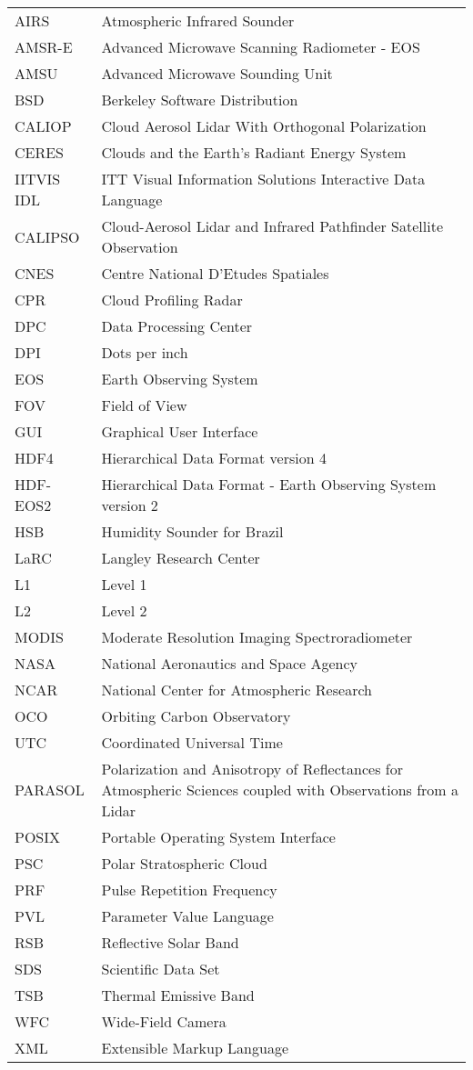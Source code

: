 \hspace{-7pt}%
\begin{tabularx}{\textwidth}{lX}
AIRS 		&Atmospheric Infrared Sounder\\
AMSR-E		&Advanced Microwave Scanning Radiometer - EOS\\
AMSU		&Advanced Microwave Sounding Unit\\
BSD		&Berkeley Software Distribution\\
CALIOP		&Cloud Aerosol Lidar With Orthogonal Polarization\\
CERES		&Clouds and the Earth’s Radiant Energy System\\
IITVIS IDL	&ITT Visual Information Solutions Interactive Data Language\\
CALIPSO		&Cloud-Aerosol Lidar and Infrared Pathfinder Satellite Observation\\
CNES		&Centre National D'Etudes Spatiales\\
CPR		&Cloud Profiling Radar\\
DPC		&Data Processing Center\\
DPI		&Dots per inch\\
EOS		&Earth Observing System\\
FOV		&Field of View\\
GUI		&Graphical User Interface\\
HDF4		&Hierarchical Data Format version 4\\
HDF-EOS2	&Hierarchical Data Format - Earth Observing System version 2\\
HSB		&Humidity Sounder for Brazil\\
LaRC		&Langley Research Center\\
L1		&Level 1\\
L2		&Level 2\\
MODIS		&Moderate Resolution Imaging Spectroradiometer\\
NASA		&National Aeronautics and Space Agency\\
NCAR		&National Center for Atmospheric Research\\
OCO		&Orbiting Carbon Observatory\\
UTC		&Coordinated Universal Time\\
PARASOL		&Polarization and Anisotropy of Reflectances for Atmospheric Sciences coupled with Observations from a Lidar\\
POSIX		&Portable Operating System Interface\\
PSC		&Polar Stratospheric Cloud\\
PRF		&Pulse Repetition Frequency\\
PVL		&Parameter Value Language\\
RSB		&Reflective Solar Band\\
SDS		&Scientific Data Set\\
TSB		&Thermal Emissive Band\\
WFC		&Wide-Field Camera\\
XML		&Extensible Markup Language
\end{tabularx}
